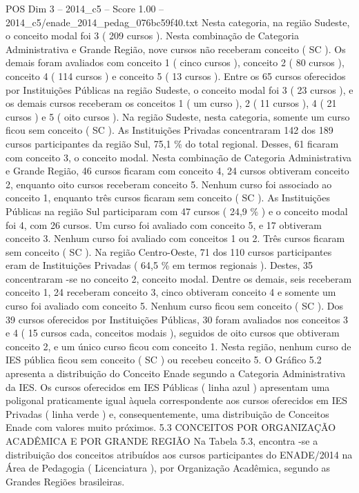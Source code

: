 \begin{textsample}{POS Dim 3 – 2014\_c5 – Score 1.00 – 2014\_c5/enade\_2014\_pedag\_076bc59f40.txt}
Nesta categoria, na região Sudeste, o conceito modal foi 3 ( 209 cursos ).
Nesta combinação de Categoria Administrativa e Grande Região, nove cursos não receberam conceito ( SC ).
Os demais foram avaliados com conceito 1 ( cinco cursos ), conceito 2 ( 80 cursos ), conceito 4 ( 114 cursos ) e conceito 5 ( 13 cursos ).
Entre os 65 cursos oferecidos por Instituições Públicas na região Sudeste, o conceito modal foi 3 ( 23 cursos ), e os demais cursos receberam os conceitos 1 ( um curso ), 2 ( 11 cursos ), 4 ( 21 cursos ) e 5 ( oito cursos ).
Na região Sudeste, nesta categoria, somente um curso ficou sem conceito ( SC ).
As Instituições Privadas concentraram 142 dos 189 cursos participantes da região Sul, 75,1 \% do total regional.
Desses, 61 ficaram com conceito 3, o conceito modal.
Nesta combinação de Categoria Administrativa e Grande Região, 46 cursos ficaram com conceito 4, 24 cursos obtiveram conceito 2, enquanto oito cursos receberam conceito 5.
Nenhum curso foi associado ao conceito 1, enquanto três cursos ficaram sem conceito ( SC ).
As Instituições Públicas na região Sul participaram com 47 cursos ( 24,9 \% ) e o conceito modal foi 4, com 26 cursos.
Um curso foi avaliado com conceito 5, e 17 obtiveram conceito 3.
Nenhum curso foi avaliado com conceitos 1 ou 2.
Três cursos ficaram sem conceito ( SC ).
Na região Centro-Oeste, 71 dos 110 cursos participantes eram de Instituições Privadas ( 64,5 \% em termos regionais ).
Destes, 35 concentraram -se no conceito 2, conceito modal.
Dentre os demais, seis receberam conceito 1, 24 receberam conceito 3, cinco obtiveram conceito 4 e somente um curso foi avaliado com conceito 5.
Nenhum curso ficou sem conceito ( SC ).
Dos 39 cursos oferecidos por Instituições Públicas, 30 foram avaliados nos conceitos 3 e 4 ( 15 cursos cada, conceitos modais ), seguidos de oito cursos que obtiveram conceito 2, e um único curso ficou com conceito 1.
Nesta região, nenhum curso de IES pública ficou sem conceito ( SC ) ou recebeu conceito 5.
O Gráfico 5.2 apresenta a distribuição do Conceito Enade segundo a Categoria Administrativa da IES.
Os cursos oferecidos em IES Públicas ( linha azul ) apresentam uma poligonal praticamente igual àquela correspondente aos cursos oferecidos em IES Privadas ( linha verde ) e, consequentemente, uma distribuição de Conceitos Enade com valores muito próximos. 5.3 CONCEITOS POR ORGANIZAÇÃO ACADÊMICA E POR GRANDE REGIÃO Na Tabela 5.3, encontra -se a distribuição dos conceitos atribuídos aos cursos participantes do ENADE/2014 na Área de Pedagogia ( Licenciatura ), por Organização Acadêmica, segundo as Grandes Regiões brasileiras.

\end{textsample}
